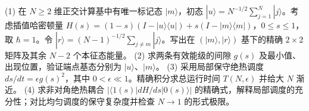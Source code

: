 (1) 在 \(N\ge2\) 维正交计算基中有唯一标记态 \(|m\rangle\)，初态 \(|u\rangle=N^{-1/2}\sum_{j=1}^N|j\rangle\)。考虑插值哈密顿量 \(H(s)=(1-s)(I-|u\rangle\langle u|)+s(I-|m\rangle\langle m|)\)，\(0\le s\le1\)，取 \(\hbar=1\)。令 \(|r\rangle=(N-1)^{-1/2}\sum_{j\ne m}|j\rangle\)。写出在 \((|m\rangle,|r\rangle)\) 基下的精确 \(2\times2\) 矩阵及其余 \(N-2\) 个本征态能量。
(2) 求两条有效能级的间隙 \(g(s)\) 及最小值、出现位置，验证端点基态分别为 \(|u\rangle\)、\(|m\rangle\)。
(3) 采用局部保守绝热调度 \(ds/dt=\epsilon g(s)^2\)，其中 \(0<\epsilon\ll1\)。精确积分求总运行时间 \(T(N,\epsilon)\) 并给大 \(N\) 渐近。
(4) 求非对角绝热耦合 \(|\langle1(s)|dH/ds|0(s)\rangle|\) 的精确式，解释局部调度的充分性；对比均匀调度的保守复杂度并检查 \(N\to1\) 的形式极限。
